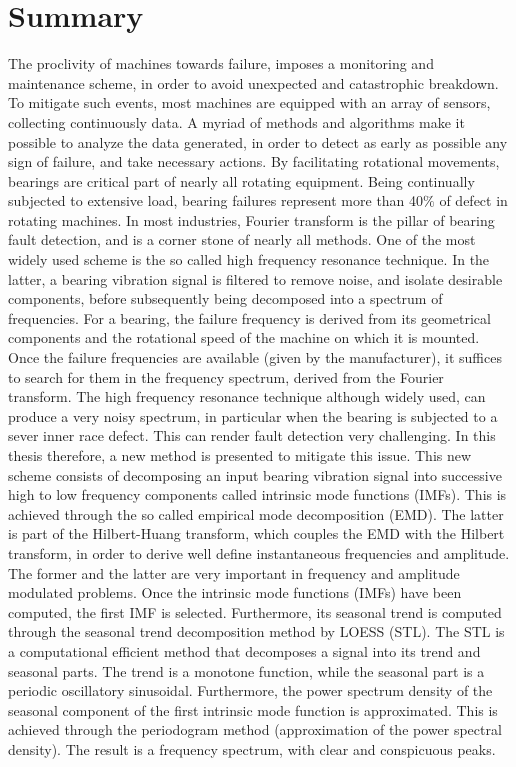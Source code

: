 \documentclass[../Main/thesis.tex]{subfiles}
\begin{document}
	\section{Summary}
	\label{sec:summary_and_conclusions}
	 The proclivity of machines towards failure, imposes a monitoring and maintenance scheme, in order to avoid unexpected and catastrophic breakdown. To mitigate such events, most machines are equipped with an array of sensors, collecting continuously data. A myriad of methods and algorithms make it possible to analyze the data generated, in order to detect as early as possible any sign of failure, and take necessary actions.
	\justify
	By facilitating rotational movements, bearings are critical part of nearly all rotating equipment. Being continually subjected to extensive load, bearing failures represent more than 40$\%$ of defect in rotating machines. In most industries, Fourier transform is the pillar of bearing fault detection, and is a corner stone of nearly all methods.
	One of the most widely used scheme is the so called high frequency resonance technique. 
	In the latter, a bearing vibration signal is filtered to remove noise, and isolate desirable components, before subsequently being decomposed into a spectrum of frequencies. For a bearing, the failure frequency is derived from its geometrical components and the rotational speed of the machine on which it is mounted. Once the failure frequencies are available (given by the manufacturer), it suffices to search for them in the frequency spectrum, derived from the Fourier transform. 
	\justify
	The high frequency resonance technique although widely used, can produce a very noisy spectrum, in particular when the bearing is subjected to a sever inner race defect. This can render fault detection very challenging. In this thesis therefore, a new method is presented to mitigate this issue.
	This new scheme consists of decomposing an input bearing vibration signal into successive high to low frequency components called intrinsic mode functions (IMFs). This is achieved through the so called empirical mode decomposition (EMD). The latter is part of the Hilbert-Huang transform, which couples the EMD with the Hilbert transform, in order to derive well define instantaneous frequencies and amplitude. The former and the latter are very important in frequency and amplitude modulated problems.
	\justify
	Once the intrinsic mode functions (IMFs) have been computed, the first IMF is selected. Furthermore, its seasonal trend is computed through the seasonal trend decomposition method by LOESS (STL). The STL is a computational efficient method that decomposes a signal into its trend and seasonal parts. The trend is a monotone function, while the seasonal part is a periodic oscillatory sinusoidal. Furthermore, the power spectrum density of the seasonal component of the first intrinsic mode function is approximated. This is achieved through the periodogram method (approximation of the power spectral density). The result is a frequency spectrum, with clear and conspicuous peaks.
\end{document}
